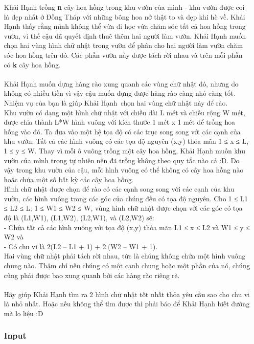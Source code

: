 

Khải Hạnh trồng \textbf{ n } cây hoa hồng trong khu vườn của mình - khu vườn được coi là đẹp nhất ở Đồng Tháp với những bông hoa nở thật to và đẹp khi hè về. Khải Hạnh thấy rằng mình không thể vừa đi học vừa chăm sóc tất cả hoa hồng trong vườn, vì thế cậu đã quyết định thuê thêm hai người làm vườn. Khải Hạnh muốn chọn hai vùng hình chữ nhật trong vườn để phân cho hai người làm vườn chăm sóc hoa hồng trên đó. Các phần vườn này được tách rời nhau và trên mỗi phần có \textbf{ k } cây hoa hồng.
\\
\\Khải Hạnh muốn dựng hàng rào xung quanh các vùng chữ nhật đó, nhưng do không có nhiều tiền vì vậy cậu muốn dựng được hàng rào càng nhỏ càng tốt. Nhiệm vụ của bạn là giúp Khải Hạnh chọn hai vùng chữ nhật này để rào.
\\Khu vườn có dạng một hình chữ nhật với chiều dài L mét và chiều rộng W mét, được chia thành L*W hình vuông với kích thước 1 mét x 1 mét để trồng hoa hồng vào đó. Ta đưa vào một hệ tọa độ có các trục song song với các cạnh của khu vườn. Tất cả các hình vuông có các tọa độ nguyên (x,y) thỏa mãn 1 ≤ x ≤ L, 1 ≤ y ≤ W. Thay vì mỗi ô vuông trồng một cây hoa hồng, Khải Hạnh muốn khu vườn của mình trong tự nhiên nên đã trồng không theo quy tắc nào cả :D. Do vậy trong khu vườn của cậu, mỗi hình vuông có thể không có cây hoa hồng nào hoặc chứa một số bất kỳ các cây hoa hồng.
\\Hình chữ nhật được chọn để rào có các cạnh song song với các cạnh của khu vườn, các hình vuông trong các góc của chúng đều có tọa độ nguyên. Cho 1 ≤ L1 ≤ L2 ≤ L; 1 ≤ W1 ≤ W2 ≤ W, vùng hình chữ nhật được chọn với các góc có tọa độ là (L1,W1), (L1,W2), (L2,W1), và (L2,W2) sẽ:
\\- Chứa tất cả các hình vuông với tọa độ (x,y) thỏa mãn L1 ≤ x ≤ L2 và W1 ≤ y ≤ W2 và
\\- Có chu vi là 2(L2 – L1 + 1) + 2.(W2 – W1 + 1).
\\Hai vùng chữ nhật phải tách rời nhau, tức là chúng không chứa một hình vuông chung nào. Thậm chí nếu chúng có một cạnh chung hoặc một phần của nó, chúng cũng phải được bao xung quanh bởi các hàng rào riêng rẽ.
\\
\\Hãy giúp Khải Hạnh tìm ra 2 hình chữ nhật tốt nhất thỏa yêu cầu sao cho chu vi là nhỏ nhất. Hoặc nếu không thể tìm được thì phải báo để Khải Hạnh biết đường mà lo liệu :D

\subsubsection{Input}

